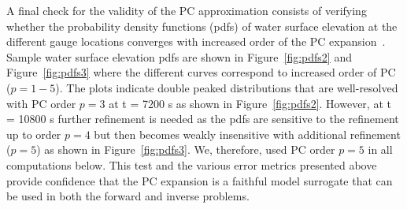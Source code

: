 
 
A final check for the validity of the PC approximation 
consists of verifying whether the probability density
functions (pdfs) of water surface elevation at the different gauge locations
converges with increased order of the PC expansion~\cite{Alexanderian2012,sraj:2013a}.  Sample
water surface elevation pdfs are shown in Figure~\ref{fig:pdfs2}
and Figure~\ref{fig:pdfs3} where
the different curves correspond to increased order of PC ($p= 1-5$).
The plots indicate double peaked distributions that are
well-resolved with PC order $p=3$ at t = 7200 s as shown in Figure~\ref{fig:pdfs2}.
However, at t = 10800 s further refinement is needed as the pdfs are
sensitive to the refinement up to order $p=4$ but then becomes weakly 
insensitive with additional refinement  ($p = 5$) as shown in Figure~\ref{fig:pdfs3}. 
We, therefore, used PC order $p = 5$ in all computations below.
This test and the various error metrics presented above provide confidence that the PC expansion is a faithful 
model surrogate that can be used in both the forward and inverse problems. 

